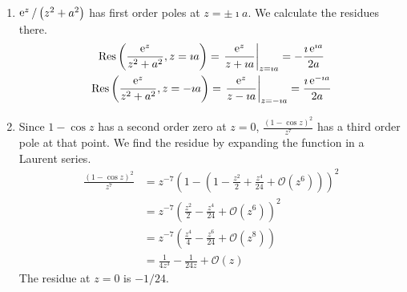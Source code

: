 {\begin{Solution}
\begin{enumerate}
\begin{align*}
      \\
      &= 0
    \end{align*}
  \item 
    $\mathop{\mathrm{e}}\nolimits^z / \left( z^2 + a^2 \right)$ has first order poles at $z = \pm \imath a$.  
    We calculate the residues there.
    \begin{gather*}
      \mathop{\mathrm{Res}}\nolimits \left( \frac{\mathop{\mathrm{e}}\nolimits^z}{z^2 + a^2}, z = \imath a \right)
      = \left. \frac{\mathop{\mathrm{e}}\nolimits^z}{z + \imath a} \right|_{z = \imath a}
      = - \frac{\imath \mathop{\mathrm{e}}\nolimits^{\imath a}}{2 a}
      \\
      \mathop{\mathrm{Res}}\nolimits \left( \frac{\mathop{\mathrm{e}}\nolimits^z}{z^2 + a^2}, z = - \imath a \right)
      = \left. \frac{\mathop{\mathrm{e}}\nolimits^z}{z - \imath a} \right|_{z = - \imath a}
      = \frac{\imath \mathop{\mathrm{e}}\nolimits^{- \imath a}}{2 a}
    \end{gather*}
  \item 
    Since $1 - \cos z$ has a second order zero at $z = 0$, 
    $\frac{(1 - \cos z)^2}{z^7}$ has a third order pole at that point.
    We find the residue by expanding the function in a Laurent series.
    \begin{align*}
      \frac{(1 - \cos z)^2}{z^7}
      &= z^{-7} \left( 1 - \left( 1 - \frac{z^2}{2} + \frac{z^4}{24} 
          + \mathcal{O}\left( z^6 \right) \right) \right)^2
      \\
      &= z^{-7} \left( \frac{z^2}{2} - \frac{z^4}{24} 
        + \mathcal{O}\left( z^6 \right) \right)^2
      \\
      &= z^{-7} \left( \frac{z^4}{4} - \frac{z^6}{24} 
        + \mathcal{O}\left( z^8 \right) \right) 
      \\
      &= \frac{1}{4 z^3} - \frac{1}{24 z} + \mathcal{O}(z)
    \end{align*}
    The residue at $z = 0$ is $- 1 / 24$.
  \end{enumerate}
\end{Solution}









}

